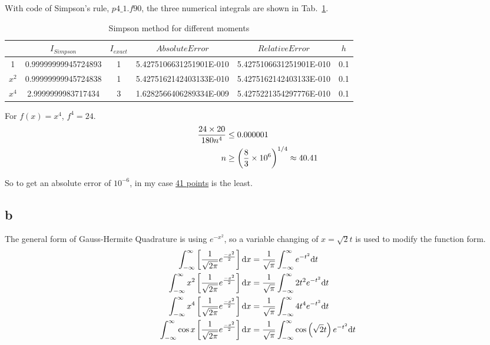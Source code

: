\documentclass[letterpaper,10pt]{article}
\begin{document}
With code of Simpson's rule, $p4\_1.f90$, the three numerical integrals are shown in Tab.~\ref{tab4_1}. 
\begin{table}[htbp]
  \centering  
  \caption{Simpson method for different moments}\label{tab4_1}
  \begin{tabular}{cccccc}
    \hline
    & $I_{Simpson}$ & $I_{exact}$ & $Absolute Error$ & $Relative Error$& $h$\\
    \hline
    1 & 0.99999999945724893 & 1 & 5.4275106631251901E-010 & 5.4275106631251901E-010 & 0.1\\
    $x^2$ & 0.99999999945724838 & 1 & 5.4275162142403133E-010 & 5.4275162142403133E-010 & 0.1\\
    $x^4$ & 2.9999999983717434 & 3 & 1.6282566406289334E-009 & 5.4275221354297776E-010 & 0.1\\
    \hline
  \end{tabular}
\end{table}

For $f\left(x\right)=x^4$, $f^{4} = 24$. 
\begin{align}
  \frac{24\times 20}{180n^4} &\leq 0.000001\notag\\
  n &\geq \left(\frac{8}{3}\times 10^6\right)^{1/4} \approx 40.41
\end{align}

So to get an absolute error of $10^{-6}$, in my case \underline{41 points} is the least. 
\subsection{b}
The general form of Gauss-Hermite Quadrature is using $e^{-x^2}$, so a variable changing of $x=\sqrt{2}t$ 
is used to modify the function form. 
\begin{align}
  \int_{-\infty}^{\infty} \left[\frac{1}{\sqrt{2\pi}}e^{\frac{-x^2}{2}}\right]\mathrm{d}x &= \frac{1}{\sqrt{\pi}}\int_{-\infty}^{\infty} e^{-t^2}\mathrm{d}t\notag\\
  \int_{-\infty}^{\infty} x^2\left[\frac{1}{\sqrt{2\pi}}e^{\frac{-x^2}{2}}\right]\mathrm{d}x &= \frac{1}{\sqrt{\pi}}\int_{-\infty}^{\infty} 2t^2 e^{-t^2}\mathrm{d}t\notag\\
  \int_{-\infty}^{\infty} x^4\left[\frac{1}{\sqrt{2\pi}}e^{\frac{-x^2}{2}}\right]\mathrm{d}x &= \frac{1}{\sqrt{\pi}}\int_{-\infty}^{\infty} 4t^4 e^{-t^2}\mathrm{d}t\notag\\
  \int_{-\infty}^{\infty} \cos x \left[\frac{1}{\sqrt{2\pi}}e^{\frac{-x^2}{2}}\right]\mathrm{d}x &= \frac{1}{\sqrt{\pi}}\int_{-\infty}^{\infty} \cos \left(\sqrt{2}t\right) e^{-t^2}\mathrm{d}t\notag
\end{align}
\end{document}

